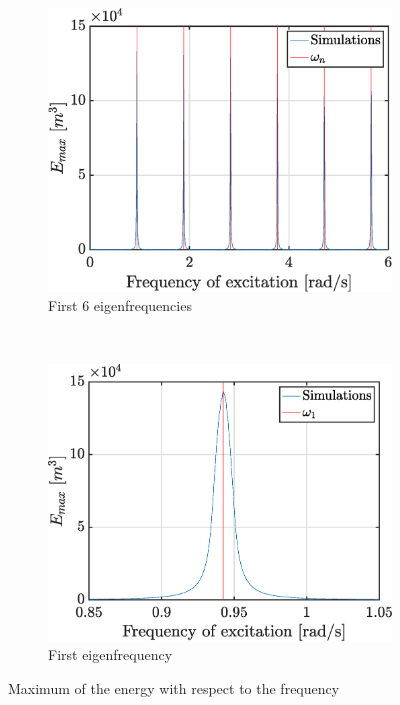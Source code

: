\documentclass[a4paper,12pt,twoside]{article}
\begin{document}
    \begin{figure}[h!]
     \begin{subfigure}{0.5\textwidth}
      \includegraphics[width=\textwidth]{graphs/Eom.eps}
      \caption{First 6 eigenfrequencies}
      \label{fig:Eom_o}
     \end{subfigure}
     ~
     \begin{subfigure}{0.5\textwidth}
      \includegraphics[width=\textwidth]{graphs/Eomzoom.eps}
      \caption{First eigenfrequency}
      \label{fig:Eom_z}
     \end{subfigure}
     \caption{Maximum of the energy with respect to the frequency}
     \label{fig:Eom}
    \end{figure}
\end{document}
